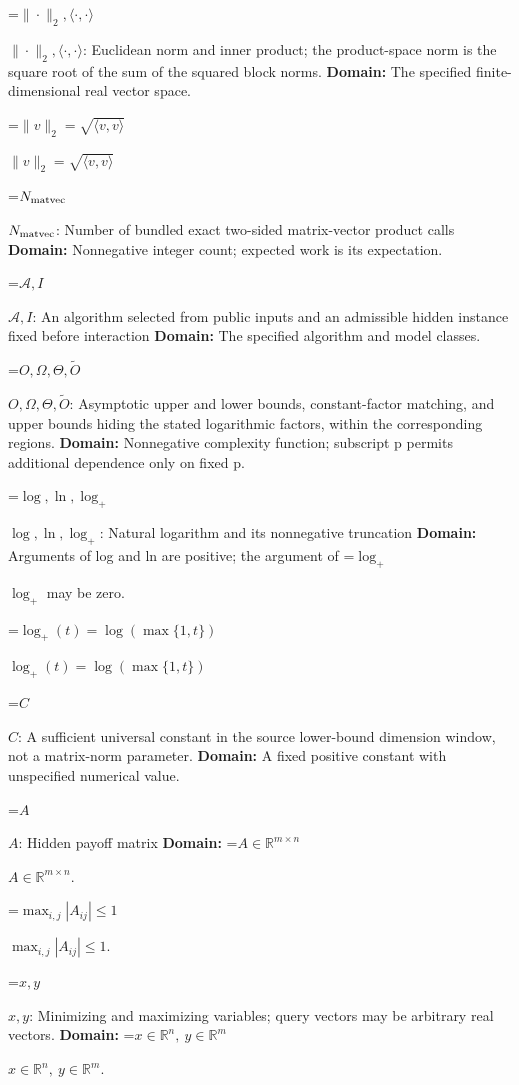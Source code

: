 \documentclass[10pt,a4paper]{article}
\newcommand{\AtlasMath}[1]{\par\begingroup\centering\setbox0=\hbox{$\displaystyle #1$}\ifdim\wd0>1.4\linewidth\typeout{ATLAS WIDE FORMULA: \the\wd0}\fi\ifdim\wd0>\linewidth\resizebox{\linewidth}{!}{\box0}\else\box0\fi\par\endgroup}
\newcommand{\AtlasInlineMath}[1]{\begingroup\setbox0=\hbox{$#1$}\ifdim\wd0>.4\linewidth\endgroup\AtlasMath{#1}\else\endgroup$#1$\fi}
\begin{document}
\AtlasInlineMath{\|\cdot\|_2,\langle\cdot,\cdot\rangle}: Euclidean norm and inner product; the product-space norm is the square root of the sum of the squared block norms. \textbf{Domain:} The specified finite-dimensional real vector space.



\AtlasInlineMath{\|v\|_2=\sqrt{\langle v,v\rangle}}



\AtlasInlineMath{N_{\rm matvec}}: Number of bundled exact two-sided matrix-vector product calls \textbf{Domain:} Nonnegative integer count; expected work is its expectation.



\AtlasInlineMath{\mathcal A,I}: An algorithm selected from public inputs and an admissible hidden instance fixed before interaction \textbf{Domain:} The specified algorithm and model classes.



\AtlasInlineMath{O,\Omega,\Theta,\widetilde O}: Asymptotic upper and lower bounds, constant-factor matching, and upper bounds hiding the stated logarithmic factors, within the corresponding regions. \textbf{Domain:} Nonnegative complexity function; subscript p permits additional dependence only on fixed p.



\AtlasInlineMath{\log,\ln,\log_+}: Natural logarithm and its nonnegative truncation \textbf{Domain:} Arguments of log and ln are positive; the argument of \AtlasInlineMath{\log_+} may be zero.



\AtlasInlineMath{\log_+(t)=\log(\max\{1,t\})}



\AtlasInlineMath{C}: A sufficient universal constant in the source lower-bound dimension window, not a matrix-norm parameter. \textbf{Domain:} A fixed positive constant with unspecified numerical value.



\AtlasInlineMath{A}: Hidden payoff matrix \textbf{Domain:} \AtlasInlineMath{A\in\mathbb R^{m\times n}}.



\AtlasInlineMath{\max_{i,j}|A_{ij}|\le1}.



\AtlasInlineMath{x,y}: Minimizing and maximizing variables; query vectors may be arbitrary real vectors. \textbf{Domain:} \AtlasInlineMath{x\in\mathbb R^n,\ y\in\mathbb R^m}.
\end{document}
